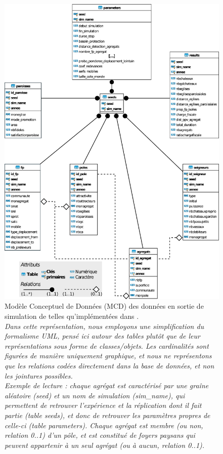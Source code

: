 \clearpage
\begin{figure}[H]
	\centering
	\captionsetup{width=\linewidth}
	\includegraphics[width=.95\linewidth]{img/MCD_SimEDB_repris.png}
	\caption[Modèle Conceptuel de Données (MCD) des données en sortie de simulation de \simfeodal{} telles qu'implémentées dans \simedb{}.]{Modèle Conceptuel de Données (MCD) des données en sortie de simulation de \simfeodal{} telles qu'implémentées dans \simedb{}.\\
\textit{Dans cette représentation, nous employons une simplification du formalisme UML, pensé ici autour des tables plutôt que de leur représentations sous forme de classes/objets.
Les cardinalités sont figurées de manière uniquement graphique, et nous ne représentons que les relations codées directement dans la base de données, et non les jointures possibles.\\
Exemple de lecture : chaque agrégat est caractérisé par une graîne aléatoire (seed) et un nom de simulation (sim\_name), qui permettent de retrouver l'expérience et la réplication dont il fait partie (table seeds), et donc de retrouver les paramètres propres de celle-ci (table parameters).
Chaque agrégat est membre (ou non, relation 0..1) d'un pôle, et est constitué de foyers paysans qui peuvent appartenir à un seul agrégat (ou à aucun, relation 0..1).
}
}
	\label{fig:MCD_SimEDB}
\end{figure}
\clearpage

